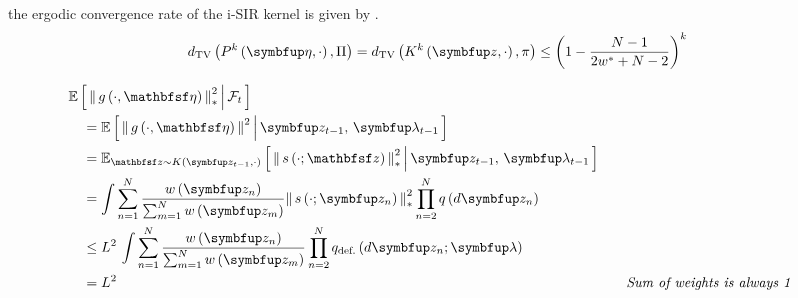 \begin{proofEnd}
  the ergodic convergence rate of the i-SIR kernel is given by \citet{andrieu_uniform_2018}.
  \begin{alignat*}{2}
    \DTV{P^{k}\left(\veta, \cdot\right)}{\Pi}
    =
    \DTV{K^{k}\left(\vz, \cdot\right)}{\pi}
    \leq
    {\left(1 - \frac{N - 1}{2 w^* + N - 2}\right)}^k
  \end{alignat*}

  \begin{alignat}{2}
    &\E{ \norm{ g\left(\cdot, \rvveta\right) }^2_{*} \,\middle|\, \mathcal{F}_{t} }
    \nonumber
    \\
    &\quad=
    \E{ \norm{ g\left(\cdot, \rvveta\right) }^2 \,\middle|\, \vz_{t-1},\, \vlambda_{t-1} }
    \nonumber
    \\
    &\quad=
    \Esub{\rvvz \sim K\left(\vz_{t-1}, \cdot\right)}{
      \norm{ s\left(\cdot; \rvvz\right) }^2_{*} \,\middle|\, \vz_{t-1},\, \vlambda_{t-1}
    }
    \nonumber
    \\
    &\quad=
    \int
    \sum^{N}_{n=1} \frac{
      w\left(\vz_n\right)
    }{
      \sum^{N}_{m=1} w\left(\vz_m\right)
    }
    \norm{ s\left(\cdot; \vz_n\right) }^2_{*}
    \prod^{N}_{n=2}
    q\left(d\vz_n\right)
    \nonumber
    \\
    &\quad\leq
    L^2 \,
    \int
    \sum^{N}_{n=1} \frac{
      w\left(\vz_n\right)
    }{
      \sum^{N}_{m=1} w\left(\vz_m\right)
    }
    \prod^{N}_{n=2}
    q_{\text{def.}}\left(d\vz_n; \vlambda\right)
    \nonumber
    \\
    &\quad=
    L^2
    &&\quad\text{\textit{Sum of weights is always 1}}
    \nonumber
  \end{alignat}


\end{proofEnd}
